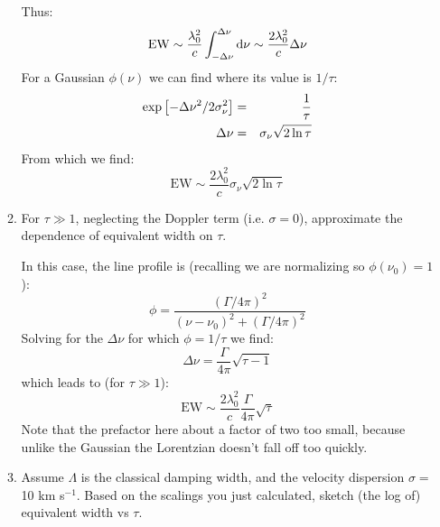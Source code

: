 \documentclass[11pt, preprint]{article}
\begin{document}
\begin{enumerate}
\begin{enumerate}
\begin{answer}
        Thus:
        \begin{equation}
          \mathrm{EW} \sim \frac{\lambda_0^2}{c}
          \int_{-\Delta\nu}^{\Delta\nu} {\rm d}\nu \sim \frac{2
            \lambda_0^2}{c} \Delta\nu
        \end{equation}
        For a Gaussian $\phi(\nu)$ we can find where its value is
        $1/\tau$:
        \begin{eqnarray}
          \exp\left[-\Delta \nu^2 / 2\sigma_\nu^2\right] &=&
          \frac{1}{\tau} \cr
          \Delta \nu &=& \sigma_\nu \sqrt{2 \ln \tau}
        \end{eqnarray}
        From which we find:
        \begin{equation}
          \mathrm{EW} 
          \sim \frac{2
            \lambda_0^2}{c} \sigma_\nu \sqrt{2 \ln \tau}
        \end{equation}
      \end{answer}
    \item For $\tau\gg 1$, neglecting the Doppler term
      (i.e. $\sigma = 0$), approximate the dependence of equivalent
      width on $\tau$.

      \begin{answer}
        In this case, the line profile is (recalling we are
        normalizing so $\phi(\nu_0) = 1$):
        \begin{equation}
          \phi = \frac{(\Gamma / 4\pi)^2}{\left(\nu - \nu_0\right)^2 +
            \left(\Gamma / 4\pi\right)^2}
        \end{equation}
        Solving for the $\Delta \nu$ for which $\phi = 1/\tau$ we find:
        \begin{equation}
          \Delta \nu = \frac{\Gamma}{4\pi} \sqrt{\tau -
            1}
        \end{equation}
        which leads to (for $\tau\gg 1$):
        \begin{equation}
          \mathrm{EW} 
          \sim \frac{2
            \lambda_0^2}{c} 
          \frac{\Gamma}{4\pi} \sqrt{\tau}
        \end{equation}
        Note that the prefactor here about a factor of two too small,
        because unlike the Gaussian the Lorentzian doesn't fall off
        too quickly.
      \end{answer}
    \item Assume $\Lambda$ is the classical damping width, and the
      velocity dispersion $\sigma =$ 10 km s$^{-1}$. Based on the
      scalings you just calculated, sketch (the log of) equivalent
      width vs $\tau$.


\end{enumerate}
\end{enumerate}
\end{document}
